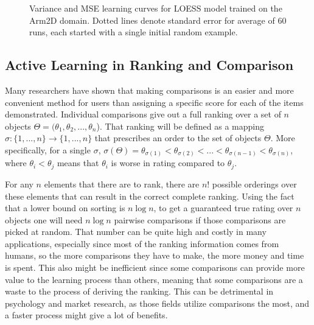 \documentclass[
  letterpaper,
  numbers=noenddot,
  DIV=11,
  oneside]{scrreprt}
\theoremstyle{remark}
\begin{document}
\begin{figure}


\caption{\label{fig-empirical:regress}Variance and MSE learning curves
for LOESS model trained on the Arm2D domain. Dotted lines denote
standard error for average of 60 runs, each started with a single
initial random example.}

\end{figure}%

\subsection{Active Learning in Ranking and
Comparison}\label{active-learning-in-ranking-and-comparison}

Many researchers have shown that making comparisons is an easier and
more convenient method for users than assigning a specific score for
each of the items demonstrated. Individual comparisons give out a full
ranking over a set of \(n\) objects
\(\Theta = (\theta_1, \theta_2, ..., \theta_n\)). That ranking will be
defined as a mapping \(\sigma : \{1,...,n\} \rightarrow \{1,...,n\}\)
that prescribes an order to the set of objects \(\Theta\). More
specifically, for a single \(\sigma\),
\(\sigma(\Theta) = \theta_{\sigma(1)} < \theta_{\sigma(2)} < ... < \theta_{\sigma(n-1)} < \theta_{\sigma(n)}\),
where \(\theta_{i} < \theta_{j}\) means that \(\theta_{i}\) is worse in
rating compared to \(\theta_{j}\).

For any \(n\) elements that there are to rank, there are \(n!\) possible
orderings over these elements that can result in the correct complete
ranking. Using the fact that a lower bound on sorting is \(n\log n\), to
get a guaranteed true rating over \(n\) objects one will need
\(n\log n\) pairwise comparisons if those comparisons are picked at
random. That number can be quite high and costly in many applications,
especially since most of the ranking information comes from humans, so
the more comparisons they have to make, the more money and time is
spent. This also might be inefficient since some comparisons can provide
more value to the learning process than others, meaning that some
comparisons are a waste to the process of deriving the ranking. This can
be detrimental in psychology and market research, as those fields
utilize comparisons the most, and a faster process might give a lot of
benefits.
\end{document}
